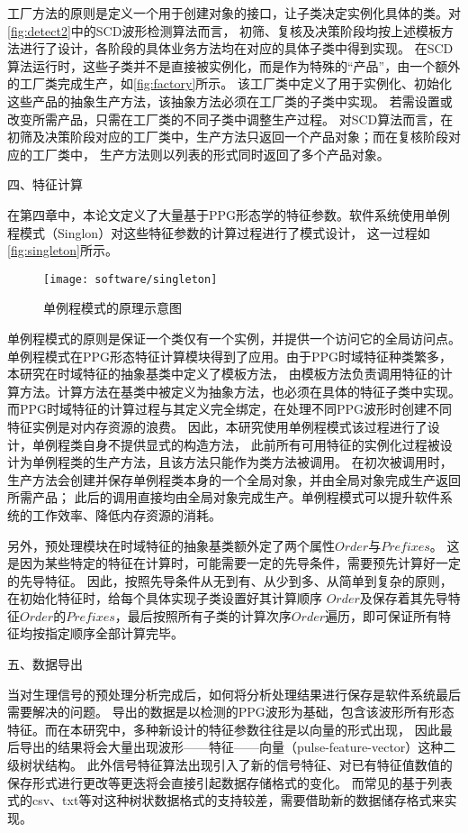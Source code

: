工厂方法的原则是定义一个用于创建对象的接口，让子类决定实例化具体的类。对\autoref{fig:detect2}中的SCD波形检测算法而言，
初筛、复核及决策阶段均按上述模板方法进行了设计，各阶段的具体业务方法均在对应的具体子类中得到实现。
在SCD算法运行时，这些子类并不是直接被实例化，而是作为特殊的“产品”，由一个额外的工厂类完成生产，如\autoref{fig:factory}所示。
该工厂类中定义了用于实例化、初始化这些产品的抽象生产方法，该抽象方法必须在工厂类的子类中实现。
若需设置或改变所需产品，只需在工厂类的不同子类中调整生产过程。
对SCD算法而言，在初筛及决策阶段对应的工厂类中，生产方法只返回一个产品对象；而在复核阶段对应的工厂类中，
生产方法则以列表的形式同时返回了多个产品对象。

四、特征计算

在第四章中，本论文定义了大量基于PPG形态学的特征参数。软件系统使用单例程模式（Singlon）对这些特征参数的计算过程进行了模式设计\cite{Li2015,Enrich2018}，
这一过程如\autoref{fig:singleton}所示。

\begin{figure}[htbp]
    \centering
    \texttt{[image: software/singleton]}
    \caption{\label{fig:singleton}单例程模式的原理示意图}
\end{figure}

单例程模式的原则是保证一个类仅有一个实例，并提供一个访问它的全局访问点。
单例程模式在PPG形态特征计算模块得到了应用。由于PPG时域特征种类繁多，本研究在时域特征的抽象基类中定义了模板方法，
由模板方法负责调用特征的计算方法。计算方法在基类中被定义为抽象方法，也必须在具体的特征子类中实现。
而PPG时域特征的计算过程与其定义完全绑定，在处理不同PPG波形时创建不同特征实例是对内存资源的浪费。
因此，本研究使用单例程模式该过程进行了设计，单例程类自身不提供显式的构造方法，
此前所有可用特征的实例化过程被设计为单例程类的生产方法，且该方法只能作为类方法被调用。
在初次被调用时，生产方法会创建并保存单例程类本身的一个全局对象，并由全局对象完成生产返回所需产品；
此后的调用直接均由全局对象完成生产。单例程模式可以提升软件系统的工作效率、降低内存资源的消耗。

另外，预处理模块在时域特征的抽象基类额外定了两个属性$Order$与$Prefixes$。
这是因为某些特定的特征在计算时，可能需要一定的先导条件，需要预先计算好一定的先导特征。
因此，按照先导条件从无到有、从少到多、从简单到复杂的原则，在初始化特征时，给每个具体实现子类设置好其计算顺序
$Order$及保存着其先导特征$Order$的$Prefixes$，最后按照所有子类的计算次序$Order$遍历，即可保证所有特征均按指定顺序全部计算完毕。

五、数据导出

当对生理信号的预处理分析完成后，如何将分析处理结果进行保存是软件系统最后需要解决的问题。
导出的数据是以检测的PPG波形为基础，包含该波形所有形态特征。而在本研究中，多种新设计的特征参数往往是以向量的形式出现，
因此最后导出的结果将会大量出现波形——特征——向量（pulse-feature-vector）这种二级树状结构。
此外信号特征算法出现引入了新的信号特征、对已有特征值数值的保存形式进行更改等更迭将会直接引起数据存储格式的变化。
而常见的基于列表式的csv、txt等对这种树状数据格式的支持较差，需要借助新的数据储存格式来实现。

